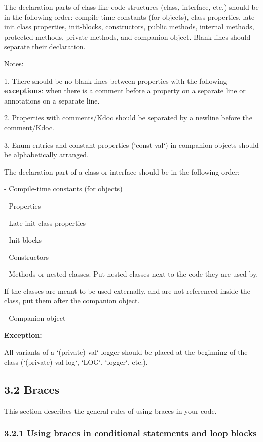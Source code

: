 The declaration parts of class-like code structures (class, interface, etc.) should be in the following order: compile-time constants (for objects), class properties, late-init class properties, init-blocks, constructors, public methods, internal methods, protected methods, private methods, and companion object. Blank lines should separate their declaration.

Notes:

1.	There should be no blank lines between properties with the following \textbf{exceptions}: when there is a comment before a property on a separate line or annotations on a separate line.

2.	Properties with comments/Kdoc should be separated by a newline before the comment/Kdoc.

3.	Enum entries and constant properties (`const val`) in companion objects should be alphabetically arranged.



The declaration part of a class or interface should be in the following order:

- Compile-time constants (for objects)

- Properties

- Late-init class properties

- Init-blocks

- Constructors

- Methods or nested classes. Put nested classes next to the code they are used by.

If the classes are meant to be used externally, and are not referenced inside the class, put them after the companion object.

- Companion object



\textbf{Exception:}

All variants of a `(private) val` logger should be placed at the beginning of the class (`(private) val log`, `LOG`, `logger`, etc.).



\subsection*{\textbf{3.2 Braces}}

This section describes the general rules of using braces in your code.

\subsubsection*{\textbf{3.2.1 Using braces in conditional statements and loop blocks}}
\leavevmode\newline



